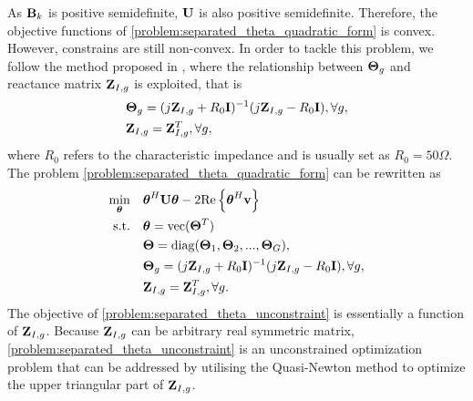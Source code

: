 As ${\bf{B}}_k$ is positive semidefinite, ${\bf U}$ is also positive semidefinite. Therefore, the objective functions of
\eqref{problem:separated_theta_quadratic_form} is convex. However, constrains are still non-convex. In order to tackle this problem, we follow the 
method proposed in \cite{shen2020modeling}, where the relationship between ${\bf \Theta}_g$ and 
reactance matrix ${\bf Z}_{I,g}$ is exploited, that is
\begin{align}
    &{\bf \Theta}_g = (j{\bf Z}_{I,g} + R_0 {\bf I})^{-1}(j{\bf Z}_{I,g} - R_0 {\bf I}), \forall g, 
    \\ &{\bf Z}_{I,g} = {\bf Z}_{I,g}^T, \forall g,
\end{align}
where $R_0$ refers to the characteristic impedance and is usually set as $R_0=50 \Omega$. The problem \eqref{problem:separated_theta_quadratic_form} can be 
rewritten as
\begin{subequations} \label{problem:separated_theta_unconstraint}
    \begin{align}
        \min_{\boldsymbol{\theta}} \quad & \boldsymbol{\theta}^H {\bf U} \boldsymbol{\theta} - 2 \mathrm{Re} \left\{ \boldsymbol{\theta}^H {\bf v} \right\}\\  
        \mathrm{s.t.} \quad &  \boldsymbol{\theta} = \mathrm{vec}({\bf \Theta}^T)
        \\ &{\bf \Theta} = \mathrm{diag}({\bf \Theta}_1,{\bf \Theta}_2,...,{\bf \Theta}_G),
        \\ &{\bf \Theta}_g = (j{\bf Z}_{I,g} + R_0 {\bf I})^{-1}(j{\bf Z}_{I,g} - R_0 {\bf I}), \forall g, 
        \\ &{\bf Z}_{I,g}={\bf Z}_{I,g}^T, \forall g.
    \end{align}
\end{subequations}
The objective of \eqref{problem:separated_theta_unconstraint} is essentially a function of ${\bf Z}_{I,g}$. Because ${\bf Z}_{I,g}$ can be arbitrary real symmetric
matrix, \eqref{problem:separated_theta_unconstraint} is an unconstrained optimization problem that can be addressed by utilising the Quasi-Newton method 
to optimize the upper triangular part of ${\bf Z}_{I,g}$.

